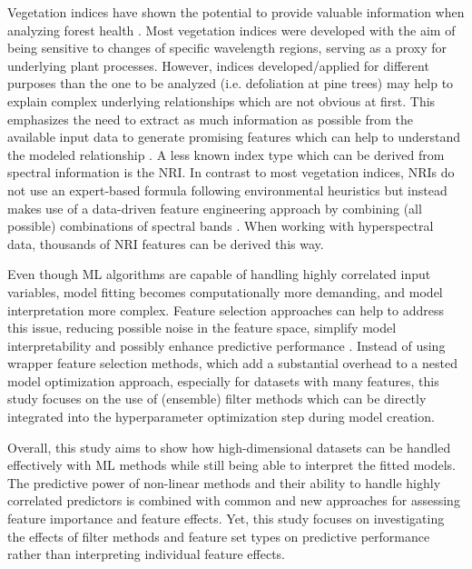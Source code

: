\documentclass[remotesensing,article,submit,moreauthors,pdftex]{Definitions/mdpi}
\begin{document}
Vegetation indices have shown the potential to provide valuable information when analyzing forest health \cite{jiang2014, adamczyk2015}.
Most vegetation indices were developed with the aim of being sensitive to changes of specific wavelength regions, serving as a proxy for underlying plant processes.
However, indices developed/applied for different purposes than the one to be analyzed (i.e. defoliation at pine trees) may help to explain complex underlying relationships which are not obvious at first.
This emphasizes the need to extract as much information as possible from the available input data to generate promising features which can help to understand the modeled relationship \cite{thenkabail2018}.
A less known index type which can be derived from spectral information is the \ac{NRI}.
In contrast to most vegetation indices, \ac{NRI}s do not use an expert-based formula following environmental heuristics but instead makes use of a data-driven feature engineering approach by combining (all possible) combinations of spectral bands \cite{thenkabail2000}.
When working with hyperspectral data, thousands of \ac{NRI} features can be derived this way.

Even though \ac{ML} algorithms are capable of handling highly correlated input variables, model fitting becomes computationally more demanding, and model interpretation more complex.
Feature selection approaches can help to address this issue, reducing possible noise in the feature space, simplify model interpretability and possibly enhance predictive performance \cite{cai2018}.
Instead of using wrapper feature selection methods, which add a substantial overhead to a nested model optimization approach, especially for datasets with many features, this study focuses on the use of (ensemble) filter methods which can be directly integrated into the hyperparameter optimization step during model creation.

Overall, this study aims to show how high-dimensional datasets can be handled effectively with ML methods while still being able to interpret the fitted models.
The predictive power of non-linear methods and their ability to handle highly correlated predictors is combined with common and new approaches for assessing feature importance and feature effects.
Yet, this study focuses on investigating the effects of filter methods and feature set types on predictive performance rather than interpreting individual feature effects.
\end{document}
